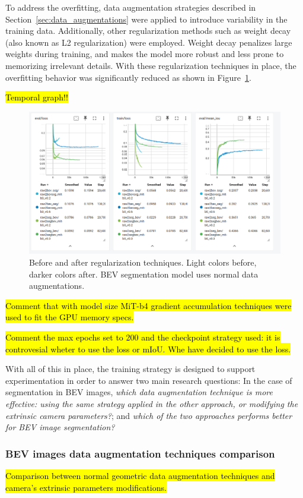 To address the overfitting, data augmentation strategies described in Section~\ref{sec:data_augmentations} were applied to introduce variability in the training data. Additionally, other regularization methods such as weight decay (also known as L2 regularization) were employed. Weight decay penalizes large weights during training, and makes the model more robust and less prone to memorizing irrelevant details. With these regularization techniques in place, the overfitting behavior was significantly reduced as shown in Figure~\ref{fig:before_after_data_aug}.

\hl{Temporal graph!!}
\begin{figure}[h!]
    \centering
    \includegraphics[width=0.7\linewidth]{./images/experiments/before_an_after_data_aug.png}
    \caption{Before and after regularization techniques. Light colors before, darker colors after. BEV segmentation model uses normal data augmentations.}
    \label{fig:before_after_data_aug}
\end{figure}

\hl{Comment that with model size MiT-b4 gradient accumulation techniques were used to fit the GPU memory specs.}

\hl{Comment the max epochs set to 200 and the checkpoint strategy used: it is controvesial wheter to use the loss or mIoU. Whe have decided to use the loss.}

With all of this in place, the training strategy is designed to support experimentation in order to answer two main research questions: In the case of segmentation in BEV images, \textit{which data augmentation technique is more effective: using the same strategy applied in the other approach, or modifying the extrinsic camera parameters?}; and \textit{which of the two approaches performs better for BEV image segmentation?}

\subsubsection{BEV images data augmentation techniques comparison}
\hl{Comparison between normal geometric data augmentation techniques and camera's extrinsic parameters modifications.}

